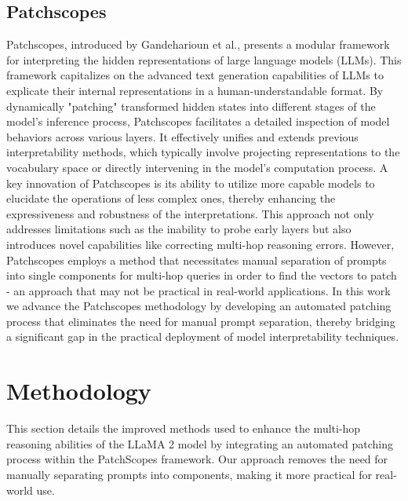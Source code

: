 \documentclass[11pt]{article}
\begin{document}
\subsection*{Patchscopes}
Patchscopes, introduced by Gandeharioun et al., presents a modular framework for interpreting the hidden representations of large language models (LLMs).
This framework capitalizes on the advanced text generation capabilities of LLMs to explicate their internal representations in a human-understandable format. By dynamically "patching" transformed hidden states into different stages of the model's inference process, Patchscopes facilitates a detailed inspection of model behaviors across various layers. It effectively unifies and extends previous interpretability methods, which typically involve projecting representations to the vocabulary space or directly intervening in the model's computation process. A key innovation of Patchscopes is its ability to utilize more capable models to elucidate the operations of less complex ones, thereby enhancing the expressiveness and robustness of the interpretations. This approach not only addresses limitations such as the inability to probe early layers but also introduces novel capabilities like correcting multi-hop reasoning errors.
\newline \newline
However, Patchscopes employs a method that necessitates manual separation of prompts into single components for multi-hop queries in order to find the vectors to patch - an approach that may not be practical in real-world applications. In this work we advance the Patchscopes methodology by developing an automated patching process that eliminates the need for manual prompt separation, thereby bridging a significant gap in the practical deployment of model interpretability techniques.


\section{Methodology}
This section details the improved methods used to enhance the multi-hop reasoning abilities of the LLaMA 2 model by integrating an automated patching process within the PatchScopes framework. Our approach removes the need for manually separating prompts into components, making it more practical for real-world use.
\end{document}
